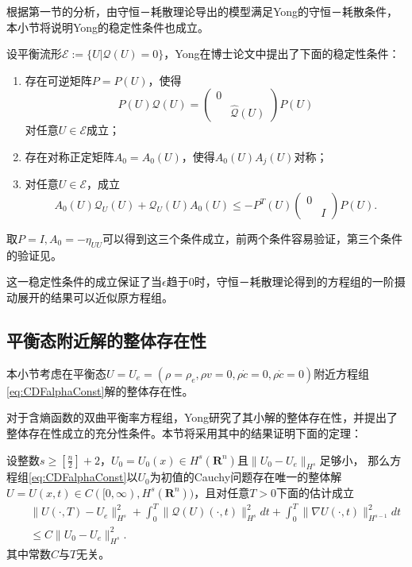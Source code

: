 根据第一节的分析，由守恒－耗散理论导出的模型满足Yong的守恒－耗散条件，本小节将说明Yong的稳定性条件也成立。

设平衡流形$\mathcal{E}:=\{U|\mathcal{Q}(U)=0\}$，Yong在博士论文\cite{yong1992singular}中提出了下面的稳定性条件：
	\begin{enumerate}
		\item 存在可逆矩阵$P=P(U)$，使得
			\begin{equation*}
				P(U)\mathcal{Q}(U) = \left( \begin{matrix}
				0 & \\
				& \hat{\mathcal{Q}}(U) 
				\end{matrix} \right) P(U)
			\end{equation*}
			对任意$U \in \mathcal{E}$成立；
		\item 存在对称正定矩阵$A_0=A_0(U)$，使得$A_0(U)A_j(U)$对称；
		\item 对任意$U \in \mathcal{E}$，成立
		\begin{equation} \label{eq:yongstability}
			A_0(U) \mathcal{Q}_U(U) +\mathcal{Q}_U(U) A_0(U) \le  - P^T(U) \left(\begin{matrix} 0 & \\ & I \end{matrix} \right) P(U). 
		\end{equation}
	\end{enumerate}
取$P=I,A_0 = -\eta_{UU}$可以得到这三个条件成立，前两个条件容易验证，第三个条件的验证见\cite{yong2008interesting}。%

这一稳定性条件的成立保证了当$\epsilon$趋于$0$时，守恒－耗散理论得到的方程组的一阶摄动展开的结果可以近似原方程组。

	\subsection{平衡态附近解的整体存在性}
	本小节考虑在平衡态$U=U_e = (\rho = \rho_e, \rho v = 0, \rho \dot{c} = 0, \rho \mathring{c} =0)$附近方程组\eqref{eq:CDFalphaConst}解的整体存在性。  

	对于含熵函数的双曲平衡率方程组，Yong研究了其小解的整体存在性\cite{yong2004entropy}，并提出了整体存在性成立的充分性条件。本节将采用其中的结果证明下面的定理：
	\begin{theorem} \label{th:Kawashima}
		设整数$s \ge [\frac{n}{2}]+2$，$U_0 = U_0(x) \in H^s(\mathbf{R}^n)$且$\|U_0 -U_e\|_{H^s}$足够小，
		那么方程组\eqref{eq:CDFalphaConst}以$U_0$为初值的Cauchy问题存在唯一的整体解$U=U(x,t) \in C([0,\infty),H^s(\mathbf{R}^n))$，且对任意$T>0$下面的估计成立
		\begin{eqnarray*}
			&& \|U(\cdot,T) - U_e \|_{H^s}^2 + \int_0^T \| \mathcal{Q}(U)(\cdot,t)\|_{H^s}^2 dt + \int_0^T \|\nabla U (\cdot,t)\|_{H^{s-1}}^2 dt \\
			&& \le C \| U_0 -U_e\|_{H^s}^2.
		\end{eqnarray*}
		其中常数$C$与$T$无关。
	\end{theorem}

